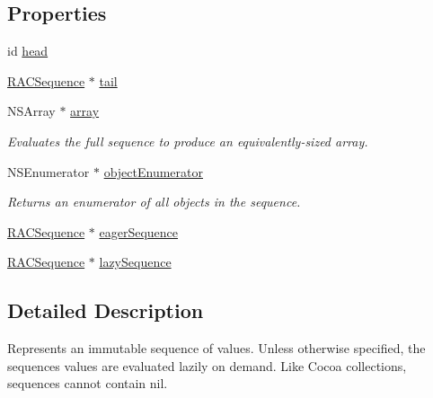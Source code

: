 \subsection*{Properties}
\begin{DoxyCompactItemize}
\item 
id \mbox{\hyperlink{interface_r_a_c_sequence_aefb922e4c06f38650b679f62c280f726}{head}}
\item 
\mbox{\hyperlink{interface_r_a_c_sequence}{R\+A\+C\+Sequence}} $\ast$ \mbox{\hyperlink{interface_r_a_c_sequence_a1cb6f0b82957ba1a7898ced27b77aa43}{tail}}
\item 
\mbox{\label{interface_r_a_c_sequence_a3a8c7cb62fe23b3a3d1de696549950f2}} 
N\+S\+Array $\ast$ \mbox{\hyperlink{interface_r_a_c_sequence_a3a8c7cb62fe23b3a3d1de696549950f2}{array}}
\begin{DoxyCompactList}\small\item\em Evaluates the full sequence to produce an equivalently-\/sized array. \end{DoxyCompactList}\item 
\mbox{\label{interface_r_a_c_sequence_ac2bb777fbc15e70c2a9365ec0e702e0d}} 
N\+S\+Enumerator $\ast$ \mbox{\hyperlink{interface_r_a_c_sequence_ac2bb777fbc15e70c2a9365ec0e702e0d}{object\+Enumerator}}
\begin{DoxyCompactList}\small\item\em Returns an enumerator of all objects in the sequence. \end{DoxyCompactList}\item 
\mbox{\hyperlink{interface_r_a_c_sequence}{R\+A\+C\+Sequence}} $\ast$ \mbox{\hyperlink{interface_r_a_c_sequence_a7a634c1999dd8289829a044e192ccf8e}{eager\+Sequence}}
\item 
\mbox{\hyperlink{interface_r_a_c_sequence}{R\+A\+C\+Sequence}} $\ast$ \mbox{\hyperlink{interface_r_a_c_sequence_adef358cf047b81c9ed2aa3a4bfee2201}{lazy\+Sequence}}
\end{DoxyCompactItemize}


\subsection{Detailed Description}
Represents an immutable sequence of values. Unless otherwise specified, the sequences\textquotesingle{} values are evaluated lazily on demand. Like Cocoa collections, sequences cannot contain nil.

